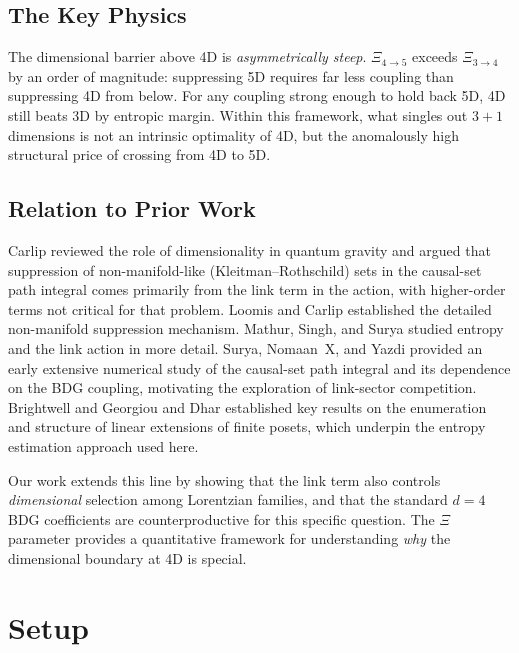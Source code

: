 \documentclass[12pt,a4paper]{article}
\begin{document}
\subsection{The Key Physics}
\label{sec:key_physics}

The dimensional barrier above 4D is \emph{asymmetrically steep}.
$\Xi_{4\to5}$ exceeds $\Xi_{3\to4}$ by an order of magnitude:
suppressing 5D requires far less coupling than suppressing 4D from below.
For any coupling strong enough to hold back 5D,
4D still beats 3D by entropic margin.
Within this framework, what singles out $3{+}1$ dimensions is not an intrinsic
optimality of 4D, but the anomalously high structural price of crossing
from 4D to 5D.

\subsection{Relation to Prior Work}
\label{sec:prior_work}

Carlip \cite{Carlip2024} reviewed the role of dimensionality in quantum gravity
and argued that suppression of non-manifold-like (Kleitman--Rothschild)
sets in the causal-set path integral comes primarily from the link term in the action,
with higher-order terms not critical for that problem.
Loomis and Carlip \cite{Loomis2018} established the detailed
non-manifold suppression mechanism. Mathur, Singh, and Surya \cite{Mathur2020} studied entropy
and the link action in more detail.
Surya, Nomaan~X, and Yazdi \cite{Surya2012} provided an early extensive
numerical study of the causal-set path integral and its dependence
on the BDG coupling, motivating the exploration of link-sector competition.
Brightwell and Georgiou \cite{Brightwell2010} and Dhar \cite{Dhar1978}
established key results on the enumeration and structure of linear extensions
of finite posets, which underpin the entropy estimation approach used here.

Our work extends this line by showing that the link term also controls \emph{dimensional} selection
among Lorentzian families, and that the standard $d{=}4$ BDG coefficients are counterproductive
for this specific question. The $\Xi$ parameter provides a quantitative framework for understanding
\emph{why} the dimensional boundary at 4D is special.


\section{Setup}
\label{sec:setup}
\end{document}
